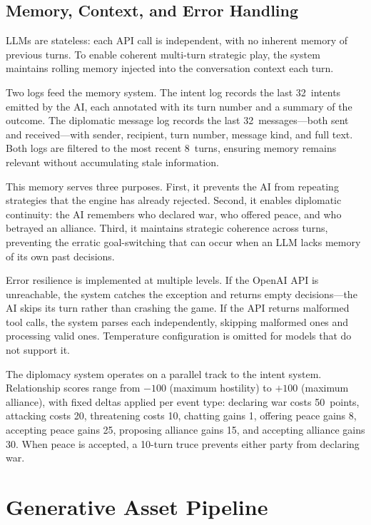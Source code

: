 \documentclass[conference]{IEEEtran}
\begin{document}
\subsection{Memory, Context, and Error Handling}

LLMs are stateless: each API call is independent, with no inherent memory
of previous turns. To enable coherent multi-turn strategic play, the
system maintains rolling memory injected into the conversation context each
turn.

Two logs feed the memory system. The intent log records the last 32~intents
emitted by the AI, each annotated with its turn number and a summary of the
outcome. The diplomatic message log records the last 32~messages---both
sent and received---with sender, recipient, turn number, message kind, and
full text. Both logs are filtered to the most recent 8~turns, ensuring
memory remains relevant without accumulating stale information.

This memory serves three purposes. First, it prevents the AI from repeating
strategies that the engine has already rejected. Second, it enables
diplomatic continuity: the AI remembers who declared war, who offered
peace, and who betrayed an alliance. Third, it maintains strategic
coherence across turns, preventing the erratic goal-switching that can
occur when an LLM lacks memory of its own past decisions.

Error resilience is implemented at multiple levels. If the OpenAI API is
unreachable, the system catches the exception and returns empty
decisions---the AI skips its turn rather than crashing the game. If the API
returns malformed tool calls, the system parses each independently,
skipping malformed ones and processing valid ones. Temperature
configuration is omitted for models that do not support it.

The diplomacy system operates on a parallel track to the intent system.
Relationship scores range from $-100$ (maximum hostility) to $+100$ (maximum
alliance), with fixed deltas applied per event type: declaring war costs
50~points, attacking costs 20, threatening costs 10, chatting gains 1,
offering peace gains 8, accepting peace gains 25, proposing alliance
gains 15, and accepting alliance gains 30. When peace is accepted, a
10-turn truce prevents either party from declaring war.

\FloatBarrier
\section{Generative Asset Pipeline}
\label{sec:assets}
\end{document}
